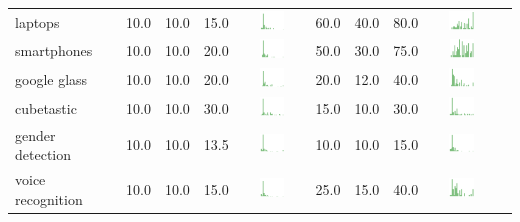 \begin{table}[t]
\begin{center}
\begin{tabular}{| p{2cm} | p{1cm} | p{1cm} | p{1cm} | c | p{2cm} | p{1cm} | p{1cm} | p{1cm} | c |}
laptops & 10.0 & 10.0 & 15.0 & \includegraphics[width = 2cm, height = 0.5cm]{tables/laptopsrisk} & 60.0 & 40.0 & 80.0 & \includegraphics[width = 2cm, height = 0.5cm]{tables/laptopsben} \\ 
smartphones & 10.0 & 10.0 & 20.0 & \includegraphics[width = 2cm, height = 0.5cm]{tables/smartphonesrisk} & 50.0 & 30.0 & 75.0 & \includegraphics[width = 2cm, height = 0.5cm]{tables/smartphonesben} \\ 
google glass & 10.0 & 10.0 & 20.0 & \includegraphics[width = 2cm, height = 0.5cm]{tables/googleglassrisk} & 20.0 & 12.0 & 40.0 & \includegraphics[width = 2cm, height = 0.5cm]{tables/googleglassben} \\ 
cubetastic & 10.0 & 10.0 & 30.0 & \includegraphics[width = 2cm, height = 0.5cm]{tables/cubetasticrisk} & 15.0 & 10.0 & 30.0 & \includegraphics[width = 2cm, height = 0.5cm]{tables/cubetasticben} \\ 
gender detection & 10.0 & 10.0 & 13.5 & \includegraphics[width = 2cm, height = 0.5cm]{tables/genderdetectionrisk} & 10.0 & 10.0 & 15.0 & \includegraphics[width = 2cm, height = 0.5cm]{tables/genderdetectionben} \\ 
voice recognition & 10.0 & 10.0 & 15.0 & \includegraphics[width = 2cm, height = 0.5cm]{tables/voicerecognitionrisk} & 25.0 & 15.0 & 40.0 & \includegraphics[width = 2cm, height = 0.5cm]{tables/voicerecognitionben} \\ 

\end{tabular}
\end{center}
\end{table}
